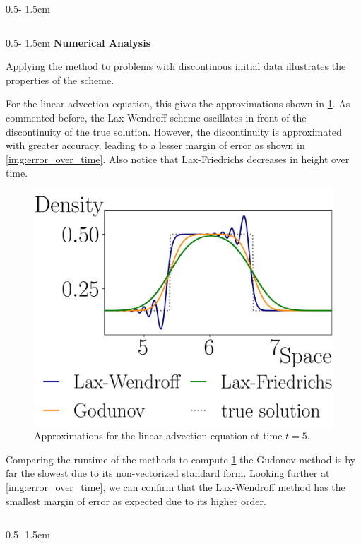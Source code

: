 \documentclass{uibposter}
\begin{document}
\begin{frame}[fragile]
\begin{columns}
\begin{column}{0.5\textwidth - 1.5cm}
\begin{column}{0.5\textwidth - 1.5cm}
\vspace{0.5cm}
\textbf{Numerical Analysis}
\vspace{0.5cm}
    
Applying the method to problems with discontinous initial data illustrates the properties of the scheme.

\vspace{0.5cm}
For the linear advection equation, this gives the approximations shown in \cref{img:linar_comprehension}. 
As commented before, the Lax-Wendroff scheme oscillates in front of the discontinuity of the true solution. However, the discontinuity is approximated with greater accuracy, leading to a lesser margin of error as shown in \cref{img:error_over_time}. Also notice that Lax-Friedrichs decreases in height over time. 

\begin{figure}[h]
	\includegraphics{fig/linear_compare.png}
	\caption{Approximations for the linear advection equation at time $t = 5$.}
	\label{img:linar_comprehension}
\end{figure}

Comparing the runtime of the methods to compute \cref{img:linar_comprehension} the Gudonov method is by far the slowest due to its non-vectorized standard form.
Looking further at \cref{img:error_over_time}, we can confirm that the Lax-Wendroff method has the smallest margin of error as expected due to its higher order.

\end{column}
\begin{column}{0.5\textwidth - 1.5cm}
	\vspace*{-1.7cm} 


\end{column}
\end{column}
\end{columns}
\end{frame}
\end{document}
